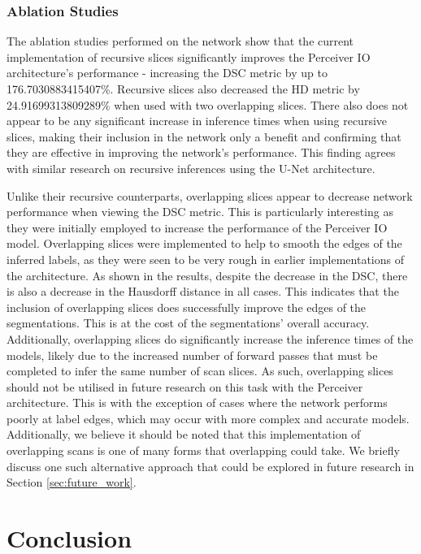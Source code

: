 \documentclass{l4proj}
\begin{document}
\subsection{Ablation Studies}

The ablation studies performed on the network show that the current implementation of recursive slices significantly improves the Perceiver IO architecture's performance - increasing the DSC metric by up to \num{176.7030883415407}\%. Recursive slices also decreased the HD metric by \num{24.91699313809289}\% when used with two overlapping slices. There also does not appear to be any significant increase in inference times when using recursive slices, making their inclusion in the network only a benefit and confirming that they are effective in improving the network's performance. This finding agrees with similar research on recursive inferences using the U-Net architecture.

Unlike their recursive counterparts, overlapping slices appear to decrease network performance when viewing the DSC metric. This is particularly interesting as they were initially employed to increase the performance of the Perceiver IO model. Overlapping slices were implemented to help to smooth the edges of the inferred labels, as they were seen to be very rough in earlier implementations of the architecture. As shown in the results, despite the decrease in the DSC, there is also a decrease in the Hausdorff distance in all cases. This indicates that the inclusion of overlapping slices does successfully improve the edges of the segmentations. This is at the cost of the segmentations' overall accuracy. Additionally, overlapping slices do significantly increase the inference times of the models, likely due to the increased number of forward passes that must be completed to infer the same number of scan slices. As such, overlapping slices should not be utilised in future research on this task with the Perceiver architecture. This is with the exception of cases where the network performs poorly at label edges, which may occur with more complex and accurate models. Additionally, we believe it should be noted that this implementation of overlapping scans is one of many forms that overlapping could take. We briefly discuss one such alternative approach that could be explored in future research in Section \ref{sec:future_work}.

\chapter{Conclusion} \label{chap:conclusion}
\end{document}
